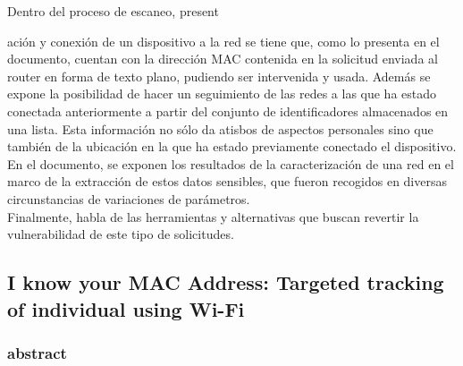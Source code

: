 Dentro del proceso de escaneo, present{ación y conexión de un dispositivo a la red se tiene que, como lo presenta en el documento, cuentan con la dirección MAC contenida en la solicitud enviada al router en forma de texto plano, pudiendo ser intervenida y usada. Además se expone la posibilidad de hacer un seguimiento de las redes a las que ha estado conectada anteriormente a partir del conjunto de identificadores almacenados en una lista. Esta información no sólo da atisbos de aspectos personales sino que también de la ubicación en la que ha estado previamente conectado el dispositivo. \\

En el documento, se exponen los resultados de la caracterización de una red en el marco de la extracción de estos datos sensibles, que fueron recogidos en diversas circunstancias de variaciones de parámetros.\\

Finalmente, habla de las herramientas y alternativas que buscan revertir la vulnerabilidad de este tipo de solicitudes. 


\subsection{I know your MAC Address: Targeted tracking of individual using Wi-Fi}
\subsubsection{abstract}

}
